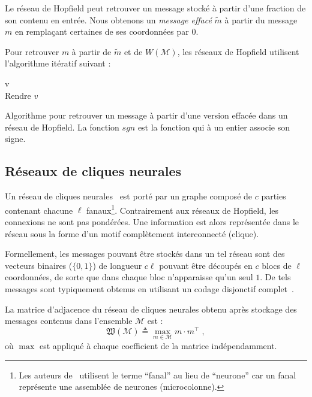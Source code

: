 \documentclass{gretsi}
\begin{document}
 Le réseau de Hopfield peut retrouver un message stocké à partir d'une fraction de son contenu en entrée. Nous obtenons un \textit{message effacé} $\tilde{m}$ à partir du message $m$ en remplaçant certaines de ses coordonnées par $0$.

 Pour retrouver $m$ à partir de $\tilde{m}$ et de $W(\mathcal{M})$, les réseaux de Hopfield utilisent l'algorithme itératif suivant :
 \begin{algorithm}
   v \leftarrow {}\\
   Rendre $v$\;
  \caption{Algorithme pour retrouver un message à partir d'une version effacée dans un réseau de Hopfield. La fonction $sgn$ est la fonction qui à un entier associe son signe.}
\end{algorithm}

\subsection{Réseaux de cliques neurales}

Un réseau de cliques neurales~\cite{} est porté par un graphe composé de $c$ parties contenant chacune $\ell$ fanaux\footnote{Les auteurs de~\cite{} utilisent le terme ``fanal'' au lieu de ``neurone'' car un fanal représente une assemblée de neurones (microcolonne).}. Contrairement aux réseaux de Hopfield, les connexions ne sont pas pondérées. Une information est alors représentée dans le réseau sous la forme d'un motif complètement interconnecté (clique).

Formellement, les messages pouvant être stockés dans un tel réseau sont des vecteurs binaires ($\{0,1\}$) de longueur $c\ell$ pouvant être découpés en $c$ blocs de $\ell$ coordonnées, de sorte que dans chaque bloc n'apparaisse qu'un seul $1$. De tels messages sont typiquement obtenus en utilisant un codage disjonctif complet~\cite{}.

La matrice d'adjacence du réseau de cliques neurales obtenu après stockage des messages contenus dans l'ensemble $\mathcal{M}$ est :
\begin{equation}
\mathfrak{W}(\mathcal{M}) \triangleq \max_{m\in\mathcal{M}}{m \cdot m^{\top}}\;,
\end{equation}
où $\max$ est appliqué à chaque coefficient de la matrice indépendamment.
\end{document}
